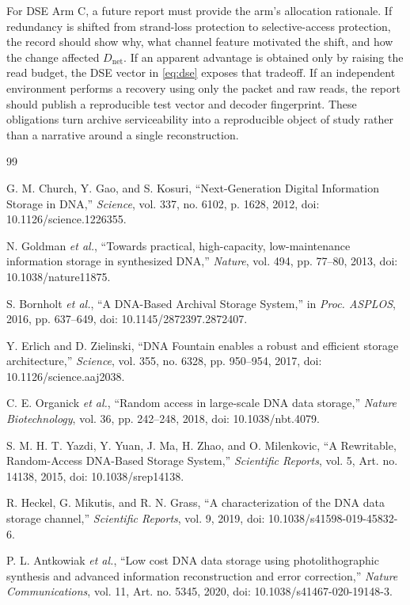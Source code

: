 \documentclass[conference]{IEEEtran}
\begin{document}
For DSE Arm C, a future report must provide the arm's allocation rationale. If redundancy is shifted from strand-loss protection to selective-access protection, the record should show why, what channel feature motivated the shift, and how the change affected $D_{\mathrm{net}}$. If an apparent advantage is obtained only by raising the read budget, the DSE vector in \eqref{eq:dse} exposes that tradeoff. If an independent environment performs a recovery using only the packet and raw reads, the report should publish a reproducible test vector and decoder fingerprint. These obligations turn archive serviceability into a reproducible object of study rather than a narrative around a single reconstruction.

\begin{thebibliography}{99}

G. M. Church, Y. Gao, and S. Kosuri, ``Next-Generation Digital Information Storage in DNA,'' \emph{Science}, vol. 337, no. 6102, p. 1628, 2012, doi: 10.1126/science.1226355.

N. Goldman \textit{et al.}, ``Towards practical, high-capacity, low-maintenance information storage in synthesized DNA,'' \emph{Nature}, vol. 494, pp. 77--80, 2013, doi: 10.1038/nature11875.

S. Bornholt \textit{et al.}, ``A DNA-Based Archival Storage System,'' in \emph{Proc. ASPLOS}, 2016, pp. 637--649, doi: 10.1145/2872397.2872407.

Y. Erlich and D. Zielinski, ``DNA Fountain enables a robust and efficient storage architecture,'' \emph{Science}, vol. 355, no. 6328, pp. 950--954, 2017, doi: 10.1126/science.aaj2038.

C. E. Organick \textit{et al.}, ``Random access in large-scale DNA data storage,'' \emph{Nature Biotechnology}, vol. 36, pp. 242--248, 2018, doi: 10.1038/nbt.4079.

S. M. H. T. Yazdi, Y. Yuan, J. Ma, H. Zhao, and O. Milenkovic, ``A Rewritable, Random-Access DNA-Based Storage System,'' \emph{Scientific Reports}, vol. 5, Art. no. 14138, 2015, doi: 10.1038/srep14138.

R. Heckel, G. Mikutis, and R. N. Grass, ``A characterization of the DNA data storage channel,'' \emph{Scientific Reports}, vol. 9, 2019, doi: 10.1038/s41598-019-45832-6.

P. L. Antkowiak \textit{et al.}, ``Low cost DNA data storage using photolithographic synthesis and advanced information reconstruction and error correction,'' \emph{Nature Communications}, vol. 11, Art. no. 5345, 2020, doi: 10.1038/s41467-020-19148-3.


\end{thebibliography}
\end{document}

